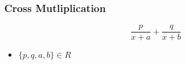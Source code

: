 \documentclass{beamer}
\begin{document}
\begin{frame}
\frametitle{Cross Mutliplication}
\Large
\[  \frac{p}{x+a} + \frac{q}{x+b}  \]

\begin{itemize}
\item $\{p,q,a,b\} \in R$
\end{itemize}

\end{frame}
\end{document}
